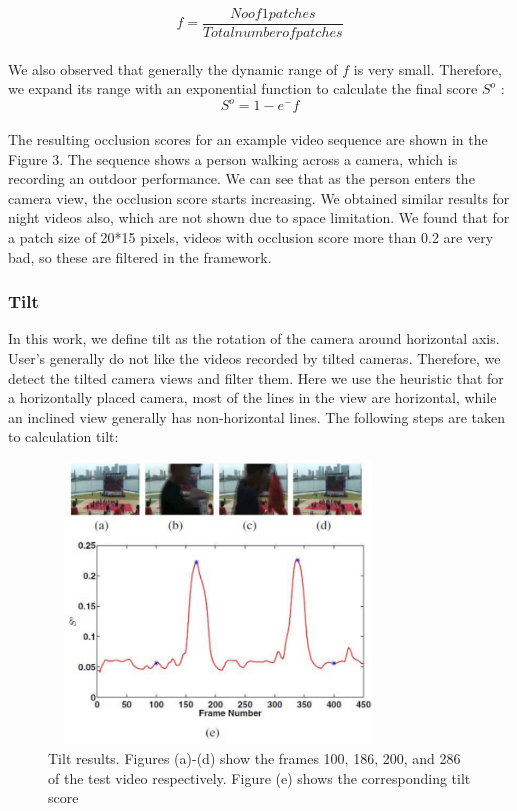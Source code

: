 \documentclass{sig-alternate}
\begin{document}
\begin{itemize}
\[f=\frac{No of 1 patches}{Total number of patches} 
\]\\
We also observed that generally the dynamic range of $f$ is very
small. Therefore, we expand its range with an exponential function
to calculate the final score $S^o$ :\\
  $$ S^o = 1 - e^-f $$\\
The resulting occlusion scores for an example video sequence
are shown in the Figure 3. The sequence shows a person walking
across a camera, which is recording an outdoor performance. We
can see that as the person enters the camera view, the occlusion
score starts increasing. We obtained similar results for night videos
also, which are not shown due to space limitation. We found that
for a patch size of 20*15 pixels, videos with occlusion score more
than 0.2 are very bad, so these are filtered in the framework.
\end{itemize}

\subsubsection{Tilt}
In this work, we define tilt as the rotation of the camera around
horizontal axis. User's generally do not like the videos recorded
by tilted cameras. Therefore, we detect the tilted camera views
and filter them. Here we use the heuristic that for a horizontally
placed camera, most of the lines in the view are horizontal, while
an inclined view generally has non-horizontal lines. The following
steps are taken to calculation tilt:



\begin{figure}[h!]
  
  \includegraphics[width=9cm, height=7.5cm]{video.pdf}
\caption{Tilt results. Figures (a)-(d) show the frames 100, 186,
200, and 286 of the test video respectively. Figure (e) shows the
corresponding tilt score}
\end{figure}
\end{document}
